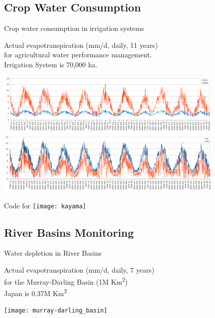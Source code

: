 \documentclass[xcolor=dvipsnames,beamer]{beamer} %
\begin{document}
\subsection{Crop Water Consumption}
\begin{frame}[fragile]{Crop water consumption in irrigation systems}

Actual evapotranspiration (mm/d, daily, 11 years)\\ 
for agricultural water performance management.\\
Irrigation System is 70,000 ha.

\begin{center}
 \includegraphics[width=11cm]{ciameanet}\\
 \includegraphics[width=11cm]{ciaminmaxet}
\end{center}
\end{frame}


\begin{frame}[fragile]{}

\begin{center}
 {\Huge Code for} 
 \hspace{10mm} 
 \texttt{[image: kayama]}
\end{center}
\end{frame}

\subsection{River Basins Monitoring}
\begin{frame}[fragile]{Water depletion in River Basins}

Actual evapotranspiration (mm/d, daily, 7 years)\\ 
for the Murray-Darling Basin (1M Km\textsuperscript{2})\\
Japan is 0.37M Km\textsuperscript{2}\\

\begin{center}
 \texttt{[image: murray-darling\_basin]}
\end{center}
\end{frame}
\end{document}
